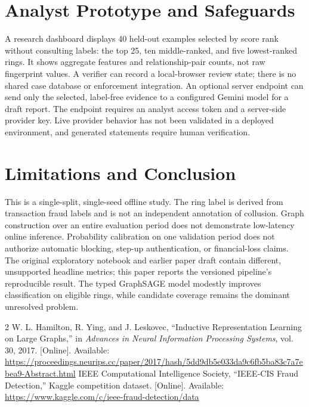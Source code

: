 \documentclass[conference]{IEEEtran}
\begin{document}
\section{Analyst Prototype and Safeguards}
A research dashboard displays 40 held-out examples selected by score rank without consulting labels: the top 25, ten middle-ranked, and five lowest-ranked rings. It shows aggregate features and relationship-pair counts, not raw fingerprint values. A verifier can record a local-browser review state; there is no shared case database or enforcement integration. An optional server endpoint can send only the selected, label-free evidence to a configured Gemini model for a draft report. The endpoint requires an analyst access token and a server-side provider key. Live provider behavior has not been validated in a deployed environment, and generated statements require human verification.

\section{Limitations and Conclusion}
This is a single-split, single-seed offline study. The ring label is derived from transaction fraud labels and is not an independent annotation of collusion. Graph construction over an entire evaluation period does not demonstrate low-latency online inference. Probability calibration on one validation period does not authorize automatic blocking, step-up authentication, or financial-loss claims. The original exploratory notebook and earlier paper draft contain different, unsupported headline metrics; this paper reports the versioned pipeline's reproducible result. The typed GraphSAGE model modestly improves classification on eligible rings, while candidate coverage remains the dominant unresolved problem.

\begin{thebibliography}{2}
 W. L. Hamilton, R. Ying, and J. Leskovec, ``Inductive Representation Learning on Large Graphs,'' in \emph{Advances in Neural Information Processing Systems}, vol. 30, 2017. [Online]. Available: \url{https://proceedings.neurips.cc/paper/2017/hash/5dd9db5e033da9c6fb5ba83c7a7ebea9-Abstract.html}
 IEEE Computational Intelligence Society, ``IEEE-CIS Fraud Detection,'' Kaggle competition dataset. [Online]. Available: \url{https://www.kaggle.com/c/ieee-fraud-detection/data}
\end{thebibliography}
\end{document}
